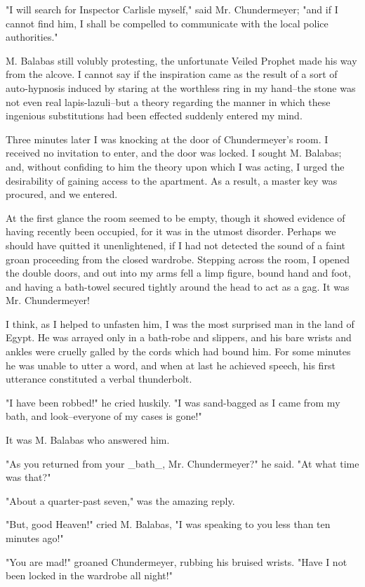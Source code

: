 "I will search for Inspector Carlisle myself," said Mr. Chundermeyer;
"and if I cannot find him, I shall be compelled to communicate with
the local police authorities."

M. Balabas still volubly protesting, the unfortunate Veiled Prophet
made his way from the alcove. I cannot say if the inspiration came as
the result of a sort of auto-hypnosis induced by staring at the worthless
ring in my hand--the stone was not even real lapis-lazuli--but a theory
regarding the manner in which these ingenious substitutions had been
effected suddenly entered my mind.

Three minutes later I was knocking at the door of Chundermeyer's room.
I received no invitation to enter, and the door was locked. I sought
M. Balabas; and, without confiding to him the theory upon which I was
acting, I urged the desirability of gaining access to the apartment.
As a result, a master key was procured, and we entered.

At the first glance the room seemed to be empty, though it showed
evidence of having recently been occupied, for it was in the utmost
disorder. Perhaps we should have quitted it unenlightened, if I had
not detected the sound of a faint groan proceeding from the closed
wardrobe. Stepping across the room, I opened the double doors, and
out into my arms fell a limp figure, bound hand and foot, and having
a bath-towel secured tightly around the head to act as a gag. It was
Mr. Chundermeyer!

I think, as I helped to unfasten him, I was the most surprised man in
the land of Egypt. He was arrayed only in a bath-robe and slippers,
and his bare wrists and ankles were cruelly galled by the cords which
had bound him. For some minutes he was unable to utter a word, and
when at last he achieved speech, his first utterance constituted a
verbal thunderbolt.

"I have been robbed!" he cried huskily. "I was sand-bagged as I came
from my bath, and look--everyone of my cases is gone!"

It was M. Balabas who answered him.

"As you returned from your _bath_, Mr. Chundermeyer?" he said. "At
what time was that?"

"About a quarter-past seven," was the amazing reply.

"But, good Heaven!" cried M. Balabas, "I was speaking to you less than
ten minutes ago!"

"You are mad!" groaned Chundermeyer, rubbing his bruised wrists. "Have
I not been locked in the wardrobe all night!"

